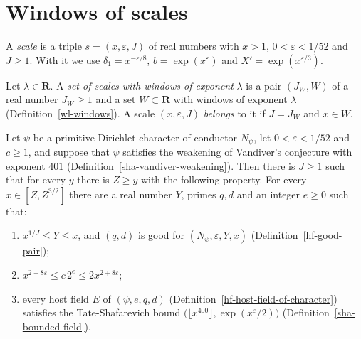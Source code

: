 \section{Windows of scales}\label{section-hf-windows}

\begin{definition}\label{hf-windows}
A \emph{scale} is a triple $s=(x,\varepsilon,J)$ of real numbers with $x>1$, $0<\varepsilon<1/52$
and $J\geq1$. With it we use $\delta_1=x^{-\varepsilon/8}$, $b=\exp(x^{\varepsilon})$ and
$X'=\exp(x^{\varepsilon/3})$.

Let $\lambda\in\mathbf R$. A \emph{set of scales with windows of exponent} $\lambda$ is a pair
$(J_W,W)$ of a real number $J_W\geq1$ and a set $W\subset\mathbf R$ with windows of exponent
$\lambda$ (Definition~\ref{wl-windows}). A scale $(x,\varepsilon,J)$ \emph{belongs} to it if $J=J_W$ and
$x\in W$.
\end{definition}

\begin{proposition}\label{hf-windows-exist}
Let $\psi$ be a primitive Dirichlet character of conductor $N_\psi$, let $0<\varepsilon<1/52$ and
$c\geq1$, and suppose that $\psi$ satisfies the weakening of Vandiver's conjecture with exponent
$401$ (Definition~\ref{sha-vandiver-weakening}). Then there is $J\geq1$ such that for every $y$ there is $Z\geq y$ with the following property. For
every $x\in[Z,Z^{3/2}]$ there are a real number $Y$, primes $q,d$ and an integer $e\geq0$ such that:
\begin{enumerate}
\item $x^{1/J}\leq Y\leq x$, and $(q,d)$ is good for $(N_\psi,\varepsilon,Y,x)$
  (Definition~\ref{hf-good-pair});
\item $x^{2+8\varepsilon}\leq c\,2^e\leq2x^{2+8\varepsilon}$;
\item every host field $E$ of $(\psi,e,q,d)$ (Definition~\ref{hf-host-field-of-character})
  satisfies the Tate-Shafarevich bound $\bigl(\lfloor x^{400}\rfloor,\exp(x^{\varepsilon}/2)\bigr)$
  (Definition~\ref{sha-bounded-field}).
\end{enumerate}
\end{proposition}

